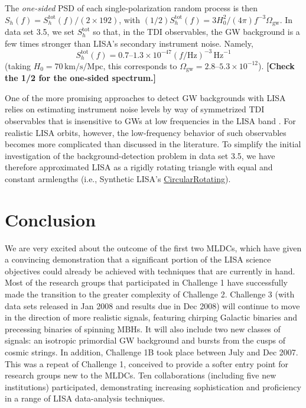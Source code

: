 \documentclass{iopart}
\begin{document}
The \emph{one-sided} PSD of each single-polarization random process is then $S_h(f) = S^\mathrm{tot}_h(f) / (2 \times 192)$, with $(1/2) S^\mathrm{tot}_h(f) = 3 H_0^2/(4 \pi) f^{-3} \Omega_\mathrm{gw}$.
In data set 3.5, we set $S^\mathrm{tot}_h$ so that, in the TDI observables, the GW background is a few times stronger than LISA's secondary instrument noise. Namely, 
%
\begin{equation}
S^\mathrm{tot}_h(f) = 0.7\mbox{--}1.3 \times 10^{-47} (f/\mathrm{Hz})^{-3} \, \mathrm{Hz}^{-1}
\end{equation}
%
(taking $H_0 = 70 \, \mathrm{km} / \mathrm{s} / \mathrm{Mpc}$, this corresponds to $\Omega_\mathrm{gw}=2.8\mbox{--}5.3 \times 10^{-12}$). \textbf{[Check the 1/2 for the one-sided spectrum.]}

One of the more promising approaches to detect GW backgrounds with LISA relies on estimating instrument noise levels by way of symmetrized TDI observables that is insensitive to GWs at low frequencies in the LISA band \cite{zetapaper}. For realistic LISA orbits, however, the low-frequency behavior of such observables becomes more complicated than discussed in the literature. To simplify the initial investigation of the background-detection problem in data set 3.5, we have therefore approximated 
LISA as a rigidly rotating triangle with equal and constant armlengths (i.e., Synthetic LISA's \url{CircularRotating}).

\section{Conclusion}

We are very excited about the outcome of the first two MLDCs, which have given a convincing demonstration that a significant portion of the LISA science objectives could already be achieved with techniques that are currently in hand. Most of the research groups that participated in Challenge 1 have successfully made the transition to the greater complexity of Challenge 2. Challenge 3 (with data sets released in Jan 2008 and results due in Dec 2008) will continue to move in the direction of more realistic signals, featuring chirping Galactic binaries and precessing binaries of spinning MBHs. It will also include two new classes of signals: an isotropic primordial GW background and bursts from the cusps of cosmic strings. In addition, Challenge 1B took place between July and Dec 2007. This was a repeat of Challenge 1, conceived to provide a softer entry point for research groups new to the MLDCs. Ten collaborations (including five new institutions) participated, demonstrating increasing sophistication and proficiency in a range of LISA data-analysis techniques.
\end{document}
